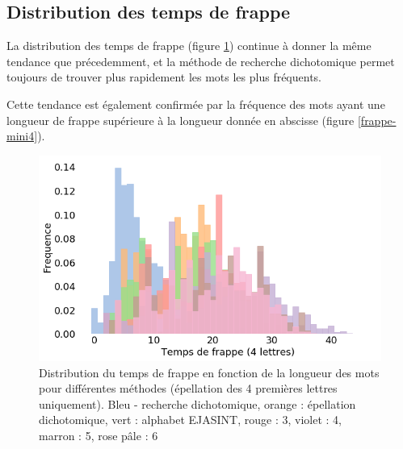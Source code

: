 \documentclass[twoside,twocolumn]{article}
\begin{document}
\subsection{Distribution des temps de frappe}

La distribution des temps de frappe (figure \ref{distrib4}) continue à donner la même tendance que précedemment, et la méthode de recherche dichotomique permet toujours de trouver plus rapidement les mots les plus fréquents.

Cette tendance est également confirmée par la fréquence des mots ayant une longueur de frappe supérieure à la longueur donnée en abscisse (figure \ref{frappe-mini4}).

\begin{center}
\begin{figure}
  \includegraphics[scale=0.35]{distrib4.png}
  \caption{Distribution du temps de frappe en fonction de la longueur des mots pour différentes méthodes (épellation des 4 premières lettres uniquement). Bleu - recherche dichotomique, orange : épellation dichotomique, vert : alphabet EJASINT, rouge : 3, violet : 4, marron : 5, rose pâle : 6}
  \label{distrib4}
\end{figure}
\end{center}
\end{document}
